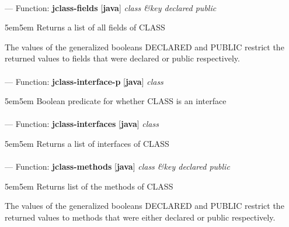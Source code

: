 \paragraph{}
\label{JAVA:JCLASS-FIELDS}
--- Function: \textbf{jclass-fields} [\textbf{java}] \textit{class \&key declared public}

\begin{adjustwidth}{5em}{5em}
Returns a list of all fields of CLASS

The values of the generalized booleans DECLARED and PUBLIC restrict
the returned values to fields that were declared or public respectively.
\end{adjustwidth}

\paragraph{}
\label{JAVA:JCLASS-INTERFACE-P}
--- Function: \textbf{jclass-interface-p} [\textbf{java}] \textit{class}

\begin{adjustwidth}{5em}{5em}
Boolean predicate for whether CLASS is an interface
\end{adjustwidth}

\paragraph{}
\label{JAVA:JCLASS-INTERFACES}
--- Function: \textbf{jclass-interfaces} [\textbf{java}] \textit{class}

\begin{adjustwidth}{5em}{5em}
Returns a list of interfaces of CLASS
\end{adjustwidth}

\paragraph{}
\label{JAVA:JCLASS-METHODS}
--- Function: \textbf{jclass-methods} [\textbf{java}] \textit{class \&key declared public}

\begin{adjustwidth}{5em}{5em}
Returns list of the methods of CLASS

The values of the generalized booleans DECLARED and PUBLIC restrict
the returned values to methods that were either declared or public
respectively.
\end{adjustwidth}

